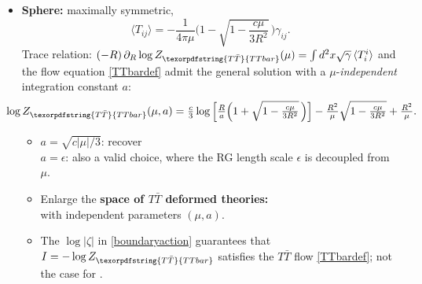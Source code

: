 \documentclass[10pt]{article}
\newcommand{\citations}[1]{{\footnotesize#1\par}}
\newcommand{\TTbar}{\texorpdfstring{\ensuremath{T\bar{T}}}{TTbar}\xspace}
\begin{document}
\begin{multicols}{3}
\begin{itemize}
\item \textbf{Sphere:} maximally symmetric,\\[-1.4\baselineskip]

\hfill\mbox{\footnotesize \textcite{Donnelly:2018bef}}
	\begin{equation}
		\langle T_{ij}\rangle = -\frac{1}{4\pi\mu} \bigg(1-\sqrt{1-\frac{c\mu}{3R^2}}\, \bigg)  \gamma_{ij}.
	\end{equation}
Trace relation: \mbox{$
(-R)\,\partial_R \log Z_{\TTbar}(\mu)=\int d^2x\sqrt{\gamma}\,\langle T^i_i \rangle
$} and the flow equation \eqref{TTbardef} 
admit the general \mbox{solution} with a $\mu$-\textit{independent} integration constant $a$:
	\begin{equation*}\small
	\hspace{-1.6em}
		\log Z_{\TTbar}(\mu, a) = \tfrac{c}{3} \log \Big[\tfrac{R}{a}   \Big(1+\sqrt{1-\tfrac{c \mu }{3  R^2}}\, \Big) \Big] - \tfrac{R^2}{\mu}  \sqrt{1-\tfrac{c \mu }{3 R^2}} + \tfrac{R^2}{\mu}. %
	\end{equation*}
	\begin{itemize}%
	\item $a = \sqrt{c|\mu|/3}$: \mbox{recover {\small
		\textsl{\citeauthor{Donnelly:2018bef}}
		\cite{Donnelly:2018bef}
	}} \\
	$a = \epsilon$: also a valid choice, where the RG length scale $\epsilon$ is decoupled from $\mu$.
	
	\item Enlarge the \textbf{space of \TTbar deformed theories:}\\
	with \mbox{independent} parameters $(\mu,a)$.
	
	\item The $\log |\zeta|$ in \eqref{boundaryaction} guarantees that $I = -\log Z_{\TTbar}$ \mbox{satisfies} the $T\bar T$ flow \eqref{TTbardef}; not the case for \cite{Donnelly:2018bef}.
	\end{itemize}

	
	\begin{flushright}
		\vspace{-.6\baselineskip}
		\citations{
			\textcite{Caputa:2020lpa}\\
			\textcite{Li:2020zjb}
		}\vspace{-.8\baselineskip}
	\end{flushright}
	

\end{itemize}
\end{multicols}
\end{document}
